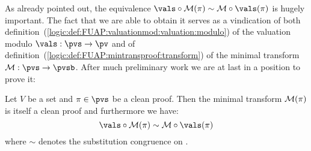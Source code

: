 As already pointed out, the equivalence $\vals\circ{\cal
M}(\pi)\sim{\cal M}\circ\vals(\pi)$ is hugely important. The fact
that we are able to obtain it serves as a vindication of both
definition~(\ref{logic:def:FUAP:valuationmod:valuation:modulo}) of
the valuation modulo $\vals:\pvs\to\pv$ and of
definition~(\ref{logic:def:FUAP:mintransproof:transform}) of the
minimal transform ${\cal M}:\pvs\to\pvsb$. After much preliminary
work we are at last in a position to prove it:


\begin{prop}\label{logic:prop:FUAP:mintransproof:valuation:commute}
Let $V$ be a set and $\pi\in\pvs$ be a clean proof. Then the minimal
transform ${\cal M}(\pi)$ is itself a clean proof and furthermore we
have:
    \begin{equation}\label{logic:eqn:FUAP:mintransproof:valuation:commute:1}
    \vals\circ{\cal M}(\pi)\sim{\cal M}\circ\vals(\pi)
    \end{equation}
where $\sim$ denotes the substitution congruence on \pvb.
\end{prop}
